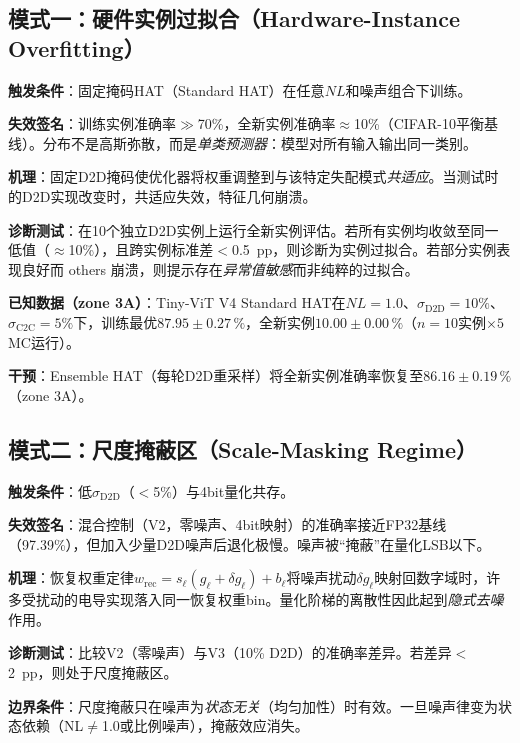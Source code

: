 \subsection{模式一：硬件实例过拟合（Hardware-Instance Overfitting）}
\label{subsec:failure_instance_overfitting}

\textbf{触发条件}：固定掩码HAT（Standard HAT）在任意$NL$和噪声组合下训练。

\textbf{失效签名}：训练实例准确率$\gg$70\%，全新实例准确率$\approx$10\%（CIFAR-10平衡基线）。分布不是高斯弥散，而是\emph{单类预测器}：模型对所有输入输出同一类别。

\textbf{机理}：固定D2D掩码使优化器将权重调整到与该特定失配模式\emph{共适应}。当测试时的D2D实现改变时，共适应失效，特征几何崩溃。

\textbf{诊断测试}：在10个独立D2D实例上运行全新实例评估。若所有实例均收敛至同一低值（$\approx$10\%），且跨实例标准差$<$0.5~pp，则诊断为实例过拟合。若部分实例表现良好而 others 崩溃，则提示存在\emph{异常值敏感}而非纯粹的过拟合。

\textbf{已知数据（zone 3A）}：Tiny-ViT V4 Standard HAT在$NL=1.0$、$\sigma_{\mathrm{D2D}}=10\%$、$\sigma_{\mathrm{C2C}}=5\%$下，训练最优$87.95\pm0.27\,\%$，全新实例$10.00\pm0.00\,\%$（$n=10$实例$\times5$ MC运行）。

\textbf{干预}：Ensemble HAT（每轮D2D重采样）将全新实例准确率恢复至$86.16\pm0.19\,\%$（zone 3A）。

\subsection{模式二：尺度掩蔽区（Scale-Masking Regime）}
\label{subsec:failure_scale_masking}

\textbf{触发条件}：低$\sigma_{\mathrm{D2D}}$（$<$5\%）与4bit量化共存。

\textbf{失效签名}：混合控制（V2，零噪声、4bit映射）的准确率接近FP32基线（97.39\%），但加入少量D2D噪声后退化极慢。噪声被“掩蔽”在量化LSB以下。

\textbf{机理}：恢复权重定律$w_{\mathrm{rec}} = s_{\ell}(g_{\ell} + \delta g_{\ell}) + b_{\ell}$将噪声扰动$\delta g_{\ell}$映射回数字域时，许多受扰动的电导实现落入同一恢复权重bin。量化阶梯的离散性因此起到\emph{隐式去噪}作用。

\textbf{诊断测试}：比较V2（零噪声）与V3（10\% D2D）的准确率差异。若差异$<$2~pp，则处于尺度掩蔽区。

\textbf{边界条件}：尺度掩蔽只在噪声为\emph{状态无关}（均匀加性）时有效。一旦噪声律变为状态依赖（NL$\neq$1.0或比例噪声），掩蔽效应消失。

